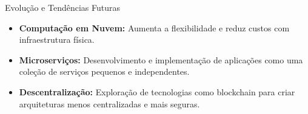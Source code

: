 \begin{frame}{Evolução e Tendências Futuras}
  \begin{itemize}
    \item \textbf{Computação em Nuvem:} Aumenta a flexibilidade e reduz custos com infraestrutura física.
    \item \textbf{Microserviços:} Desenvolvimento e implementação de aplicações como uma coleção de serviços pequenos e independentes.
    \item \textbf{Descentralização:} Exploração de tecnologias como blockchain para criar arquiteturas menos centralizadas e mais seguras.
  \end{itemize}
\end{frame}
